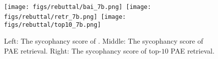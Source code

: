 {\begin{algorithm}[!t]
    

\end{algorithm}

\begin{figure}[!t]
\centering
\texttt{[image: figs/rebuttal/bai\_7b.png]}\!\!\!\!\!\
\texttt{[image: figs/rebuttal/retr\_7b.png]}\!\!\!\!\!\
\texttt{[image: figs/rebuttal/top10\_7b.png]}
\caption{Left: The sycophancy score of \citet{bai2024}. Middle: The sycophancy score of PAE retrieval. Right: The sycophancy score of top-$10$ PAE retrieval.}
\label{fig:rebuttal-pae}
\end{figure}

}
